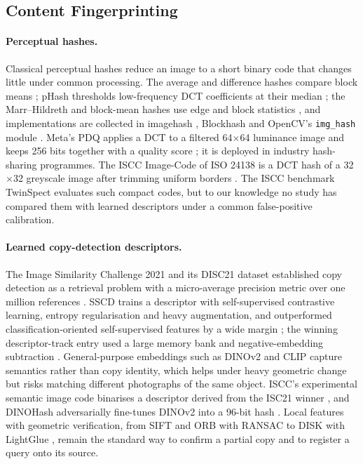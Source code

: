 \subsection{Content Fingerprinting}
\paragraph{Perceptual hashes.} Classical perceptual hashes reduce an image to a short binary code that changes little under common processing. The average and difference hashes compare block means \cite{krawetz2011looks, krawetz2013kind}; pHash thresholds low-frequency DCT coefficients at their median \cite{zauner2010phash}; the Marr--Hildreth and block-mean hashes use edge and block statistics \cite{zauner2010phash, yang2006blockhash}, and implementations are collected in imagehash \cite{buchner_imagehash}, Blockhash \cite{commonsmachinery_blockhash} and OpenCV's \texttt{img\_hash} module \cite{opencv_imghash}. Meta's PDQ applies a DCT to a filtered 64$\times$64 luminance image and keeps 256 bits together with a quality score \cite{meta2019pdq}; it is deployed in industry hash-sharing programmes. The ISCC Image-Code of ISO 24138 is a DCT hash of a 32$\times$32 greyscale image after trimming uniform borders \cite{iso24138}. The ISCC benchmark TwinSpect \cite{iscc_twinspect} evaluates such compact codes, but to our knowledge no study has compared them with learned descriptors under a common false-positive calibration.

\paragraph{Learned copy-detection descriptors.} The Image Similarity Challenge 2021 and its DISC21 dataset established copy detection as a retrieval problem with a micro-average precision metric over one million references \cite{douze2021isc}. SSCD trains a descriptor with self-supervised contrastive learning, entropy regularisation and heavy augmentation, and outperformed classification-oriented self-supervised features by a wide margin \cite{pizzi2022sscd}; the winning descriptor-track entry used a large memory bank and negative-embedding subtraction \cite{yokoo2021isc}. General-purpose embeddings such as DINOv2 \cite{oquab2024dinov2} and CLIP \cite{radford2021clip, cherti2023openclip} capture semantics rather than copy identity, which helps under heavy geometric change but risks matching different photographs of the same object. ISCC's experimental semantic image code binarises a descriptor derived from the ISC21 winner \cite{iscc_sci}, and DINOHash adversarially fine-tunes DINOv2 into a 96-bit hash \cite{singhi2025dinohash}. Local features with geometric verification, from SIFT \cite{lowe2004sift} and ORB \cite{rublee2011orb} with RANSAC \cite{fischler1981ransac} to DISK \cite{tyszkiewicz2020disk} with LightGlue \cite{lindenberger2023lightglue}, remain the standard way to confirm a partial copy and to register a query onto its source.

